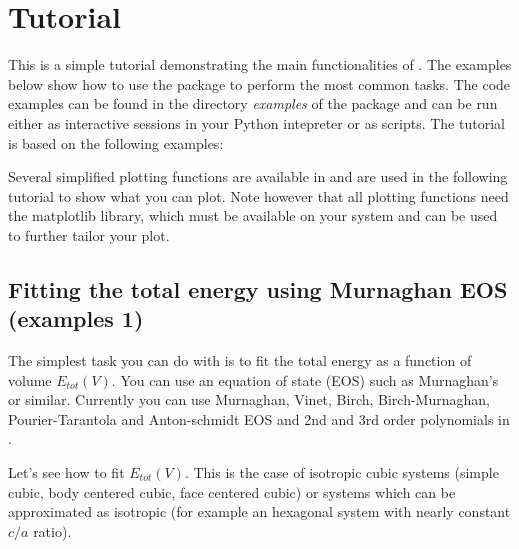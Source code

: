 \documentclass[letterpaper,10pt,english]{sphinxmanual}
\begin{document}
\chapter{Tutorial}
\label{tutorial::doc}\label{tutorial:tutorial}\label{tutorial:id1}
This is a simple tutorial demonstrating the main functionalities of . The examples below show how to use the package to perform the most common tasks. The code examples can be found in the directory \emph{examples} of the package and can be run either as interactive sessions in your Python intepreter or as scripts.
The tutorial is based on the following examples:

Several simplified plotting functions are available in  and are used in the following tutorial to show what you can plot.
Note however that all plotting functions need the matplotlib library, which must be available on your system and can be used to further tailor your plot.


\section{Fitting the total energy using Murnaghan EOS (examples 1)}
\label{tutorial:fitting-the-total-energy-using-murnaghan-eos-examples-1}
The simplest task you can do with  is to fit the total energy as a function of volume \(E_{tot}(V)\). You can use
an equation of state (EOS) such as Murnaghan's or similar.  Currently you can use Murnaghan, Vinet, Birch, Birch-Murnaghan, Pourier-Tarantola and Anton-schmidt EOS and 2nd and 3rd order polynomials in .

Let's see how to fit \(E_{tot}(V)\). This is the case of isotropic cubic systems (simple cubic, body centered cubic, face centered cubic) or systems which can be approximated as isotropic (for example an hexagonal system with nearly constant \(c/a\) ratio).
\end{document}

